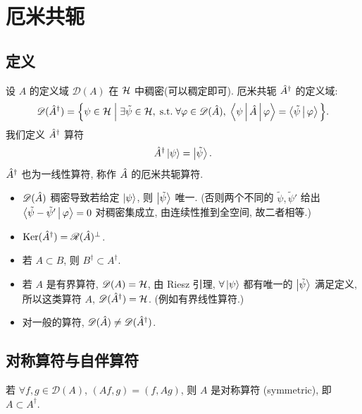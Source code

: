 \section{厄米共轭}\label{sec:adjoint}

\subsection{定义}

设 $A$ 的定义域 $\mathscr D(A)$ 在 $\mathcal{H}$ 中稠密(可以稠定即可). 厄米共轭 $\hat{A}^{\dagger}$ 的定义域:
\begin{equation}
\mathscr D(\hat{A}^{\dagger})=\Big\{\psi\in\mathcal{H}\;\Big|\; \exists \tilde\psi\in\mathcal{H},\;\text{s.t.}\;\forall \varphi\in\mathscr D(\hat{A}),\;\left\langle \psi \,\middle|\, \hat{A} \,\middle|\, \varphi \right\rangle=\left\langle \tilde\psi \,\middle|\, \varphi \right\rangle\Big\}.
\end{equation}
我们定义 $\hat{A}^{\dagger}$ 算符
\begin{equation}
\hat{A}^{\dagger}\ket\psi=\ket{\tilde\psi}.
\end{equation}
$\hat{A}^{\dagger}$ 也为一线性算符, 称作 $\hat{A}$ 的厄米共轭算符.

\begin{itemize}
    \item $\mathscr D(\hat{A})$ 稠密导致若给定 $\ket\psi$, 则 $\ket{\tilde\psi}$ 唯一. (否则两个不同的 $\tilde\psi,\tilde\psi'$ 给出 $\left\langle \tilde\psi-\tilde\psi' \,\middle|\, \varphi \right\rangle=0$ 对稠密集成立, 由连续性推到全空间, 故二者相等.)
    \item $\mathrm{Ker}(\hat{A}^{\dagger})=\mathscr R(\hat{A})^{\perp}$.
    \item 若 $A\subset B$, 则 $B^{\dagger}\subset A^{\dagger}$.
    \item 若 $A$ 是有界算符, $\mathscr D(A)=\mathcal{H}$, 由 Riesz 引理, $\forall \ket\psi$ 都有唯一的 $\ket{\tilde\psi}$ 满足定义, 所以这类算符 $A$, $\mathscr D(\hat{A}^{\dagger})=\mathcal{H}$. (例如有界线性算符.)
    \item 对一般的算符, $\mathscr D(\hat{A})\neq \mathscr D(\hat{A}^{\dagger})$.
\end{itemize}

\subsection{对称算符与自伴算符}

\begin{definition}[对称算符]
若 $\forall f,g\in\mathscr D(A)$, $(Af,g)=(f,Ag)$, 则 $A$ 是对称算符 (symmetric), 即 $A\subset A^{\dagger}$.
\end{definition}

